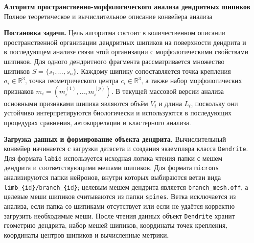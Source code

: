 \documentclass[12pt,a4paper]{article}
\begin{document}
\begin{center}
{\Large\textbf{Алгоритм пространственно-морфологического анализа дендритных шипиков}}\\[0.5em]
{\normalsize Полное теоретическое и вычислительное описание конвейера анализа}
\end{center}

\noindent\textbf{Постановка задачи.}
Цель алгоритма состоит в количественном описании пространственной организации дендритных шипиков на поверхности дендрита и в последующем анализе связи этой организации с морфологическими свойствами шипиков. Для одного дендритного фрагмента рассматривается множество шипиков \(S=\{s_1,\ldots,s_n\}\). Каждому шипику сопоставляется точка крепления \(a_i\in\mathbb{R}^3\), точка геометрического центра \(c_i\in\mathbb{R}^3\), а также набор морфологических признаков \(m_i=(m_i^{(1)},\ldots,m_i^{(p)})\). В текущей массовой версии анализа основными признаками шипика являются объём \(V_i\) и длина \(L_i\), поскольку они устойчиво интерпретируются биологически и используются в последующих процедурах сравнения, автокорреляции и кластерного анализа.

\noindent\textbf{Загрузка данных и формирование объекта дендрита.}
Вычислительный конвейер начинается с загрузки датасета и создания экземпляра класса \texttt{Dendrite}. Для формата \texttt{labid} используется исходная логика чтения папки с мешем дендрита и соответствующими мешами шипиков. Для формата \texttt{microns} анализируются папки нейронов, внутри которых выбираются ветви вида \texttt{limb\_\{id\}/branch\_\{id\}}; целевым мешем дендрита является \texttt{branch\_mesh.off}, а целевые меши шипиков считываются из папки \texttt{spines}. Ветка исключается из анализа, если папка со шипиками отсутствует или если не удаётся корректно загрузить необходимые меши. После чтения данных объект \texttt{Dendrite} хранит геометрию дендрита, набор мешей шипиков, координаты точек крепления, координаты центров шипиков и вычисленные метрики.
\end{document}
